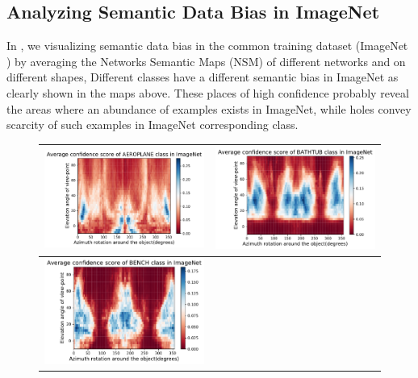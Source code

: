 \subsection{Analyzing Semantic Data Bias in ImageNet}
In \figLabel{\ref{fig:dsm1},\ref{fig:dsm2}}, we visualizing semantic data bias in the common training dataset (\ie ImageNet \cite{IMAGENET}) by averaging the Networks Semantic Maps (NSM) of different networks and on different shapes, Different classes have a different semantic bias in ImageNet as clearly shown in the maps above. These places of high confidence probably reveal the areas where an abundance of examples exists in ImageNet, while holes convey scarcity of such examples in ImageNet corresponding class.
\begin{figure}[h]
\centering
\tabcolsep=0.03cm
   \begin{tabular}{c|c}
\includegraphics[width = 9cm]{supimages/bias/aeroplane_Average_2D.pdf}&
\includegraphics[width = 9cm]{supimages/bias/bathtub_Average_2D.pdf}\\\hline
\includegraphics[width = 9cm]{supimages/bias/bench_Average_2D.pdf}&

\end{tabular}
\end{figure}
